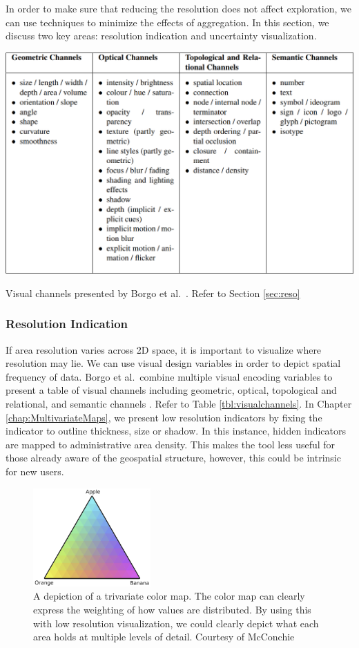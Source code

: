 In order to make sure that reducing the resolution does not affect exploration, we can use techniques to minimize the effects of aggregation. In this section, we discuss two key areas: resolution indication and uncertainty visualization.
\begin{table}[b]
\includegraphics[width=0.7\linewidth]{images/ch7/visualchannels}
\caption{Visual channels presented by Borgo et al.\ \cite{borgo2013glyph}. Refer to Section \ref{sec:reso}} \label{tbl:visualchannels}
\end{table}
\subsubsection*{Resolution Indication} \label{sec:reso}
If area resolution varies across 2D space, it is important to visualize where resolution may lie. We can use visual design variables in order to depict spatial frequency of data. Borgo et al.\ combine multiple visual encoding variables to present a table of visual channels including geometric, optical, topological and relational, and semantic channels \cite{borgo2013glyph}. Refer to Table \ref{tbl:visualchannels}. In Chapter \ref{chap:MultivariateMaps}, we present low resolution indicators by fixing the indicator to outline thickness, size or shadow. In this instance, hidden indicators are mapped to administrative area density. This makes the tool less useful for those already aware of the geospatial structure, however, this could be intrinsic for new users. %

\begin{figure}[t]
\includegraphics[width=0.4\textwidth]{images/ch7/trivariate}
\caption{A depiction of a trivariate color map. The color map can clearly express the weighting of how values are distributed. By using this with low resolution visualization, we could clearly depict what each area holds at multiple levels of detail. Courtesy of McConchie \cite{mcconchie2018pop}} \label{fig:trivariate}
\end{figure}
